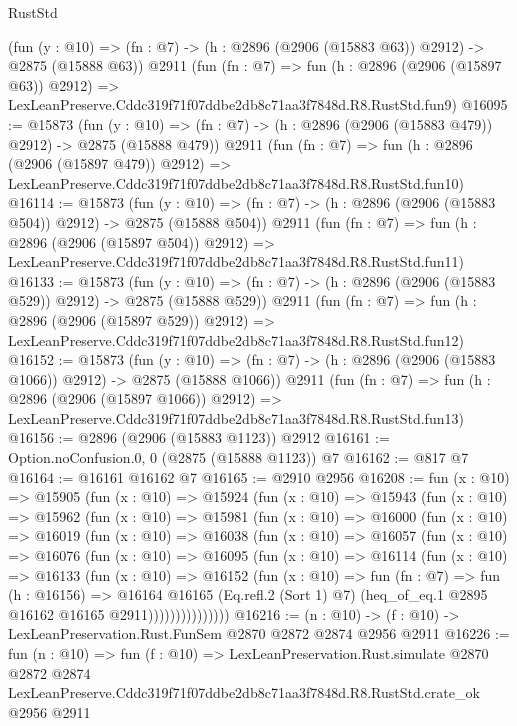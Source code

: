 \begin{lexlean}{RustStd}
\begin{coremodule}
    (fun (y : @10) => (fn : @7) -> (h : @2896 (@2906 (@15883 @63)) @2912) -> @2875 (@15888 @63))
    @2911
    (fun (fn : @7) =>
    fun (h : @2896 (@2906 (@15897 @63)) @2912) =>
    LexLeanPreserve.Cddc319f71f07ddbe2db8c71aa3f7848d.R8.RustStd.fun9)
@16095 := @15873
    (fun (y : @10) => (fn : @7) -> (h : @2896 (@2906 (@15883 @479)) @2912) -> @2875 (@15888 @479))
    @2911
    (fun (fn : @7) =>
    fun (h : @2896 (@2906 (@15897 @479)) @2912) =>
    LexLeanPreserve.Cddc319f71f07ddbe2db8c71aa3f7848d.R8.RustStd.fun10)
@16114 := @15873
    (fun (y : @10) => (fn : @7) -> (h : @2896 (@2906 (@15883 @504)) @2912) -> @2875 (@15888 @504))
    @2911
    (fun (fn : @7) =>
    fun (h : @2896 (@2906 (@15897 @504)) @2912) =>
    LexLeanPreserve.Cddc319f71f07ddbe2db8c71aa3f7848d.R8.RustStd.fun11)
@16133 := @15873
    (fun (y : @10) => (fn : @7) -> (h : @2896 (@2906 (@15883 @529)) @2912) -> @2875 (@15888 @529))
    @2911
    (fun (fn : @7) =>
    fun (h : @2896 (@2906 (@15897 @529)) @2912) =>
    LexLeanPreserve.Cddc319f71f07ddbe2db8c71aa3f7848d.R8.RustStd.fun12)
@16152 := @15873
    (fun (y : @10) => (fn : @7) -> (h : @2896 (@2906 (@15883 @1066)) @2912) -> @2875 (@15888 @1066))
    @2911
    (fun (fn : @7) =>
    fun (h : @2896 (@2906 (@15897 @1066)) @2912) =>
    LexLeanPreserve.Cddc319f71f07ddbe2db8c71aa3f7848d.R8.RustStd.fun13)
@16156 := @2896 (@2906 (@15883 @1123)) @2912
@16161 := Option.noConfusion.{0, 0} (@2875 (@15888 @1123)) @7
@16162 := @817 @7
@16164 := @16161 @16162 @7
@16165 := @2910 @2956
@16208 := fun (x : @10) =>
  @15905
    (fun (x : @10) =>
    @15924
      (fun (x : @10) =>
      @15943
        (fun (x : @10) =>
        @15962
          (fun (x : @10) =>
          @15981
            (fun (x : @10) =>
            @16000
              (fun (x : @10) =>
              @16019
                (fun (x : @10) =>
                @16038
                  (fun (x : @10) =>
                  @16057
                    (fun (x : @10) =>
                    @16076
                      (fun (x : @10) =>
                      @16095
                        (fun (x : @10) =>
                        @16114
                          (fun (x : @10) =>
                          @16133
                            (fun (x : @10) =>
                            @16152
                              (fun (x : @10) =>
                              fun (fn : @7) =>
                              fun (h : @16156) =>
                              @16164
                                @16165
                                (Eq.refl.{2} (Sort 1) @7)
                                (heq_of_eq.{1} @2895 @16162 @16165 @2911)))))))))))))))
@16216 := (n : @10) -> (f : @10) -> LexLeanPreservation.Rust.FunSem @2870 @2872 @2874 @2956 @2911
@16226 := fun (n : @10) =>
  fun (f : @10) =>
  LexLeanPreservation.Rust.simulate
    @2870
    @2872
    @2874
    LexLeanPreserve.Cddc319f71f07ddbe2db8c71aa3f7848d.R8.RustStd.crate_ok
    @2956
    @2911
\end{coremodule}
\end{lexlean}

